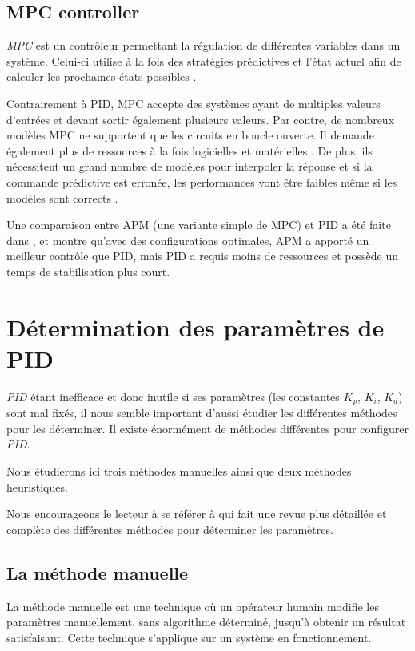 \documentclass[a4paper,10pt]{report}
\begin{document}
\subsection{MPC controller}
\emph{MPC} est un contrôleur permettant la régulation de différentes variables dans un système.
Celui-ci utilise à la fois des stratégies prédictives et l'état actuel afin de calculer les prochaines états possibles \cite{RICHALET1978413}.

Contrairement à PID, MPC accepte des systèmes ayant de multiples valeurs d'entrées et devant sortir également plusieurs valeurs.
Par contre, de nombreux modèles MPC ne supportent que les circuits en boucle ouverte.
Il demande également plus de ressources à la fois logicielles et matérielles \cite{saletovic2014apm}.
De plus, ils nécessitent un grand nombre de modèles pour interpoler la réponse et si la commande prédictive est erronée, les performances vont être faibles même si les modèles sont corrects \cite{Richalet2016}.

Une comparaison entre APM (une variante simple de MPC) et PID a été faite dans \cite{saletovic2014apm}, et montre qu'avec des configurations optimales, APM a apporté un meilleur contrôle que PID, mais PID a requis moins de ressources et possède un temps de stabilisation plus court.

\section{Détermination des paramètres de PID}

\emph{PID} étant inefficace et donc inutile si ses paramètres (les constantes $K_p$, $K_i$, $K_d$) sont mal fixés, il nous semble important d'aussi étudier les différentes méthodes pour les déterminer. Il existe énormément de méthodes différentes pour configurer \emph{PID}.

Nous étudierons ici trois méthodes manuelles ainsi que deux méthodes heuristiques.

Nous encourageons le lecteur à se référer à \cite{shahrokhi2013comparison} qui fait une revue plus détaillée et complète des différentes méthodes pour déterminer les paramètres.


\subsection{La méthode manuelle}

La méthode manuelle est une technique où un opérateur humain modifie les paramètres manuellement, sans algorithme déterminé, jusqu'à obtenir un résultat satisfaisant. Cette technique s'applique sur un système en fonctionnement.
\end{document}
